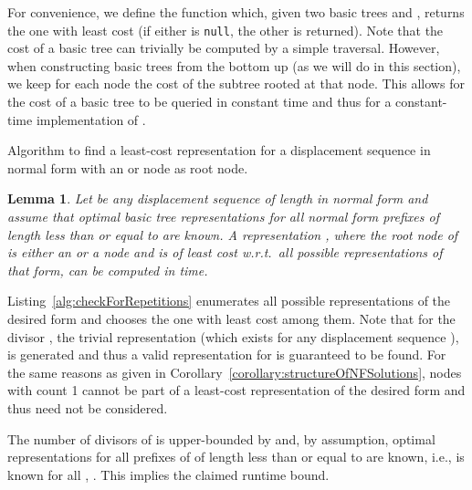 \documentclass[a4paper,11pt]{article}
\newtheorem{lemma}{Lemma}
\newenvironment{proof}{\par\noindent{\textsc{Proof:}}\space}{\protect\\ \par}
\begin{document}
For convenience, we define the function  which,
given two basic trees  and , returns the one with least cost (if
either is \verb|null|, the other is returned).  Note that the cost of
a basic tree can trivially be computed by a simple traversal.
However, when constructing basic trees from the bottom up (as we will
do in this section), we keep for each node the cost of the subtree
rooted at that node. This allows for the cost of a basic tree to be
queried in constant time and thus for a constant-time implementation
of .

\begin{algorithm}
\caption{Algorithm to find a least-cost representation for a
  displacement sequence in normal form with an  or  node
  as root node.}
\label{alg:checkForRepetitions}
\end{algorithm}

\begin{lemma}
\label{lemma:repetition}
Let  be any displacement sequence of length  in normal
form and assume that optimal basic tree representations for all normal
form prefixes of length less than or equal to  are
known.  A representation , where the root node of  is
either an  or a  node and  is of least cost
w.r.t.\ all possible representations of that form, can be computed in
 time.
\end{lemma}
\begin{proof}
Listing~\ref{alg:checkForRepetitions} enumerates all possible
representations of the desired form and chooses the one with least
cost among them.  Note that for the divisor , the trivial
representation  (which exists for any
displacement sequence ), is generated and thus a valid
representation for  is guaranteed to be found.  For the same
reasons as given in Corollary~\ref{corollary:structureOfNFSolutions},
 nodes with count 1 cannot be part of a least-cost
representation of the desired form and thus need not be considered.

The number of divisors of  is upper-bounded by
 and, by assumption, optimal representations
for all prefixes of  of length less than or equal to  are known, i.e.,  is known for all , .  This implies the claimed runtime bound.
\end{proof}
\end{document}
